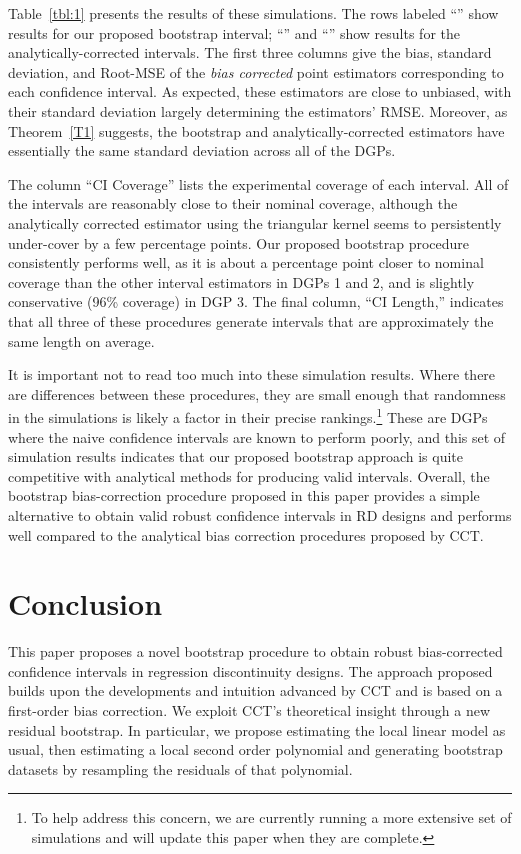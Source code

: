 \documentclass[12pt,fleqn]{article}
\begin{document}
Table~\ref{tbl:1} presents the results of these simulations. The rows labeled
``\bootuni'' show results for our proposed bootstrap interval; ``\cctuni'' and
``\ccttri'' show results for the analytically-corrected intervals. The first
three columns give the bias, standard deviation, and Root-MSE of the \emph{bias corrected} point
estimators corresponding to each confidence interval.  As expected, these
estimators are close to unbiased, with their standard deviation largely
determining the estimators' RMSE. Moreover, as Theorem~\ref{T1} suggests, the
bootstrap and analytically-corrected estimators have essentially the same
standard deviation across all of the DGPs.

The column ``CI Coverage'' lists the experimental coverage of each interval.
All of the intervals are reasonably close to their nominal coverage, although
the analytically corrected estimator using the triangular kernel seems to
persistently under-cover by a few percentage points. Our proposed bootstrap
procedure consistently performs well, as it is about a percentage point closer
to nominal coverage than the other interval estimators in DGPs 1 and 2, and is
slightly conservative (96\% coverage) in DGP 3. The final column, ``CI Length,''
indicates that all three of these procedures generate intervals that are
approximately the same length on average.

It is important not to read too much into these simulation results. Where there
are differences between these procedures, they are small enough that randomness
in the simulations is likely a factor in their precise rankings.\footnote{%
  To help address this concern, we are currently running a more extensive set of
  simulations and will update this paper when they are complete.} %
These are DGPs where the naive confidence intervals are known to perform poorly,
and this set of simulation results indicates that our proposed bootstrap approach
is quite competitive with analytical methods for producing valid intervals.
Overall, the bootstrap bias-correction procedure proposed in this paper provides
a simple alternative to obtain valid robust confidence intervals in RD designs
and performs well compared to the analytical bias correction procedures proposed
by CCT.

\section{Conclusion}\label{conclusion}
This paper proposes a novel bootstrap procedure to obtain robust bias-corrected confidence intervals in regression discontinuity designs.
The approach proposed builds upon the developments and intuition advanced by CCT and is based on a first-order bias correction.
 We exploit CCT's theoretical insight through a new residual bootstrap. In particular, we propose estimating the local linear model as usual,
then estimating a local second order polynomial and generating bootstrap datasets by resampling the residuals of that polynomial.
\end{document}
